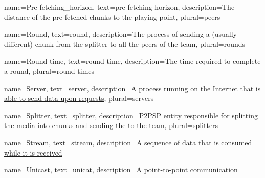  {
    name={Pre-fetching_horizon},
    text={pre-fetching horizon},
    description={The distance of the pre-fetched chunks to the playing point},
    plural={peers}
}

 {
    name={Round},
    text={round},
    description={The process of sending a (usually different) chunk from the splitter to all the peers of the team},
    plural={rounds}
}

 {
    name={Round time},
    text={round time},
    description={The time required to complete a round},
    plural={round-times}
}

 {
    name={Server},
    text={server},
    description={\href{https://en.wikipedia.org/wiki/Server_(computing)}{A process running on the Internet that is able to send data upon requests}},
    plural={servers}
}

 {
    name={Splitter},
    text={splitter},
    description={P2PSP entity responsible for splitting the \gls{media} into chunks and sending the to the team},
    plural={splitters}
}

 {
    name={Stream},
    text={stream},
    description={\href{https://en.wikipedia.org/wiki/Streaming_media}{A sequence of data that is consumed while it is received}}
}



 {
    name={Unicast},
    text={unicat},
    description={\href{https://en.wikipedia.org/wiki/Unicast}{A point-to-point communication}}
}

